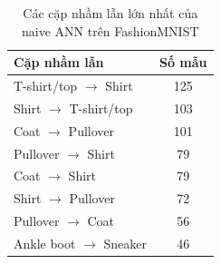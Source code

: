 \begin{table}[H]
\centering
\caption{Các cặp nhầm lẫn lớn nhất của naive ANN trên FashionMNIST}
\label{tab:fashion-mnist-naive-top-errors}
\begin{tabular}{l c}
\toprule
Cặp nhầm lẫn & Số mẫu \\
\midrule
T-shirt/top $\rightarrow$ Shirt & 125 \\
Shirt $\rightarrow$ T-shirt/top & 103 \\
Coat $\rightarrow$ Pullover & 101 \\
Pullover $\rightarrow$ Shirt & 79 \\
Coat $\rightarrow$ Shirt & 79 \\
Shirt $\rightarrow$ Pullover & 72 \\
Pullover $\rightarrow$ Coat & 56 \\
Ankle boot $\rightarrow$ Sneaker & 46 \\
\bottomrule
\end{tabular}
\end{table}
